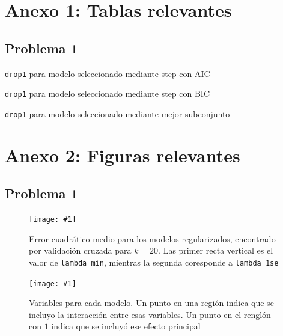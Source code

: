 \documentclass[11pt]{article}
\newcommand{\figura}[3]{\begin{figure}[H] \centering \texttt{[image: \#1]} \caption{#2} \label{#1}  \end{figure}}
\newcommand{\tablalarga}[2]{ \begin{center}  \begin{table}[H] \caption{#2} \label{#1} \end{table} \end{center}}
\begin{document}
\section*{Anexo 1: Tablas relevantes}
\subsection*{Problema 1}
\tablalarga{aicDrop.tex}{\texttt{drop1} para modelo seleccionado mediante step con AIC}
\tablalarga{bicDrop.tex}{\texttt{drop1} para modelo seleccionado mediante step con BIC}
\tablalarga{subDrop.tex}{\texttt{drop1} para modelo seleccionado mediante mejor subconjunto}
\section*{Anexo 2: Figuras relevantes}
\subsection*{Problema 1}
\figura{regularized.pdf}{Error cuadrático medio para los modelos regularizados, encontrado por validación cruzada para $k=20$. Las primer recta vertical es el valor de \texttt{lambda\_min}, mientras la segunda coresponde a \texttt{lambda\_1se}}{width=0.98\textwidth}
\figura{variables.pdf}{Variables para cada modelo. Un punto en una región indica que se incluyo la interacción entre esas variables. Un punto en el renglón con $1$ indica que se incluyó ese efecto principal}{width=0.98\textwidth}
\end{document}

